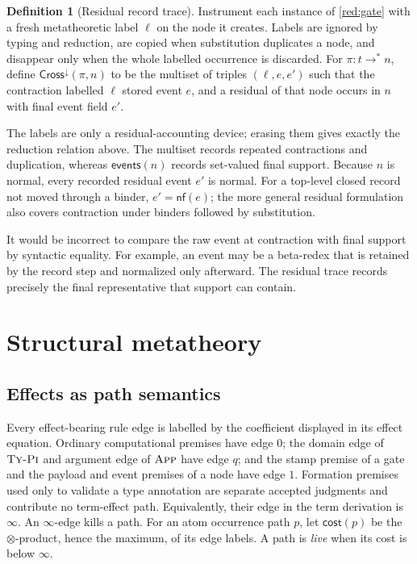 \documentclass[11pt]{article}
\numberwithin{equation}{section}
\theoremstyle{definition}
\newtheorem{definition}{Definition}[section]
\theoremstyle{plain}
\theoremstyle{remark}
\newcommand{\cost}{\mathsf{cost}}
\newcommand{\events}{\mathsf{events}}
\newcommand{\nf}{\mathsf{nf}}
\newcommand{\absent}{\boldsymbol\infty}
\newcommand{\cross}{\mathsf{Cross}}
\begin{document}
\begin{definition}[Residual record trace]\label{def:cross}
Instrument each instance of \cref{red:gate} with a fresh metatheoretic label
\(\ell\) on the node it creates.  Labels are ignored by typing and reduction,
are copied when substitution duplicates a node, and disappear only when the
whole labelled occurrence is discarded.  For
\(\pi:t\longrightarrow^*n\), define \(\cross^\downarrow(\pi,n)\) to be the
multiset of triples \((\ell,e,e')\) such that the contraction labelled
\(\ell\) stored event \(e\), and a residual of that node occurs in \(n\) with
final event field \(e'\).
\end{definition}

The labels are only a residual-accounting device; erasing them gives exactly
the reduction relation above.  The multiset records repeated contractions and
duplication, whereas \(\events(n)\) records set-valued final support.  Because
\(n\) is normal, every recorded residual event \(e'\) is normal.  For a
top-level closed record not moved through a binder, \(e'=\nf(e)\); the more
general residual formulation also covers contraction under binders followed
by substitution.

It would be incorrect to compare the raw event at contraction with final
support by syntactic equality.  For example, an event may be a beta-redex that
is retained by the record step and normalized only afterward.  The residual
trace records precisely the final representative that support can contain.

\section{Structural metatheory}\label{sec:metatheory}

\subsection{Effects as path semantics}

Every effect-bearing rule edge is labelled by the coefficient displayed in
its effect equation.  Ordinary computational premises have edge \(0\); the
domain edge of \(\textsc{Ty-Pi}\) and argument edge of \(\textsc{App}\) have
edge \(q\); and the stamp premise of a gate and the payload and event premises
of a node have edge \(1\).  Formation premises used only to validate a type
annotation are separate accepted judgments and contribute no term-effect
path.  Equivalently, their edge in the term derivation is \(\absent\).  An
\(\absent\)-edge kills a path.  For an atom occurrence path \(p\), let
\(\cost(p)\) be the \(\otimes\)-product, hence the maximum, of its edge labels.
A path is \emph{live} when its cost is below \(\absent\).
\end{document}
